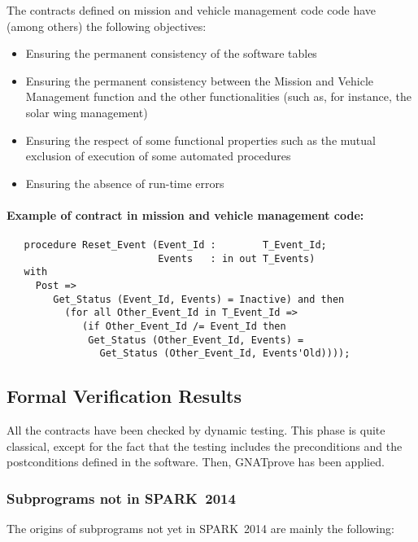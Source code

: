 \documentclass[10pt,a4paper,twocolumn]{article}
\newcommand{\gnatprove}{GNATprove\xspace}
\newcommand{\newspark}{SPARK~2014\xspace}
\begin{document}
The contracts defined on mission and vehicle management code code have (among others) the following objectives:

\begin{itemize}
\item Ensuring the permanent consistency of the software tables
\item Ensuring the permanent consistency between the Mission and Vehicle Management function and the other functionalities (such as, for instance, the solar wing management)
\item Ensuring the respect of some functional properties such as the mutual exclusion of execution of some automated procedures
\item Ensuring the absence of run-time errors
\end{itemize}

\ifdefined\abstractonly
\else
\paragraph{Example of contract in mission and vehicle management code:}

\begin{verbatim}
   procedure Reset_Event (Event_Id :        T_Event_Id;
                          Events   : in out T_Events)
   with
     Post =>
        Get_Status (Event_Id, Events) = Inactive) and then
          (for all Other_Event_Id in T_Event_Id =>
             (if Other_Event_Id /= Event_Id then
              Get_Status (Other_Event_Id, Events) =
                Get_Status (Other_Event_Id, Events'Old))));
\end{verbatim}
\fi

\subsection{Formal Verification Results}

All the contracts have been checked by dynamic testing. This phase is quite classical, except for the fact that the testing includes the preconditions and the postconditions defined in the software. Then, \gnatprove has been applied.

\ifdefined\abstractonly
\else
\subsubsection{Subprograms not in \newspark}

The origins of subprograms not yet in \newspark are mainly the following:
\end{document}

